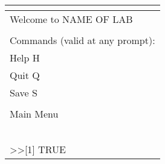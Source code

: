 %
\begin{table}[!tbp]
 \begin{center}
 \begin{tabular}{l}\hline\hline
\multicolumn{1}{c}{}\tabularnewline
\hline
	Welcome to NAME OF LAB\tabularnewline
\tabularnewline
Commands (valid at any prompt):\tabularnewline
Help	H\tabularnewline
Quit	Q\tabularnewline
Save	S\tabularnewline
\tabularnewline
Main Menu\tabularnewline
	\tabularnewline
	\tabularnewline
	\tabularnewline
	 \tabularnewline
\tabularnewline
\textgreater\textgreater [1] TRUE\tabularnewline
\hline
\end{tabular}

\end{center}

\end{table}

